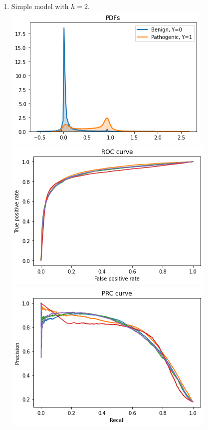 \documentclass[twoside]{article}
\begin{document}
\begin{enumerate}
		\item Simple model with $h = 2$.\\
		\includegraphics[scale=0.7]{res/img/s2pdf.png}\\
		\includegraphics[scale=0.7]{res/img/s2roc.png}\\
		\includegraphics[scale=0.7]{res/img/s2prc.png}\\
		

\end{enumerate}
\end{document}
